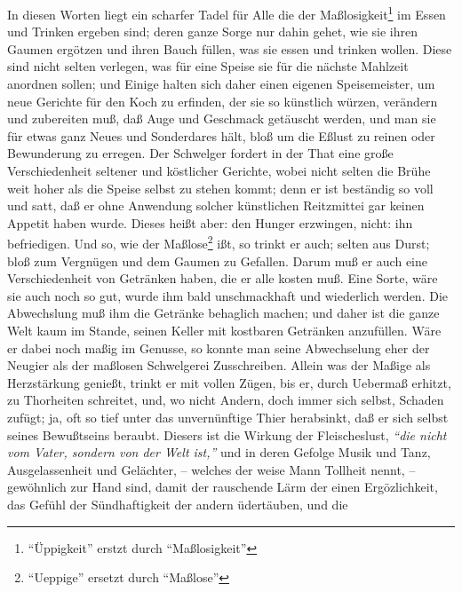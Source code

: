 \medskip

In diesen Worten liegt ein scharfer Tadel für Alle die der Maßlosigkeit\footnote{"`Üppigkeit"' erstzt durch "`Maßlosigkeit"'} im Essen
und Trinken ergeben sind; deren ganze Sorge nur dahin gehet, wie sie ihren
Gaumen ergötzen und ihren Bauch füllen, was sie essen und trinken wollen. Diese
sind nicht selten verlegen, was für eine Speise sie für die nächste Mahlzeit
anordnen sollen; und Einige halten sich daher einen eigenen Speisemeister, um
neue Gerichte für den Koch zu erfinden, der sie so künstlich würzen, verändern
und zubereiten muß, daß Auge und Geschmack getäuscht werden, und man sie für
etwas ganz Neues und Sonderdares hält, bloß um die Eßlust zu reinen oder
Bewunderung zu erregen. Der Schwelger fordert in der That eine große
Verschiedenheit seltener und köstlicher Gerichte, wobei nicht selten die Brühe
weit hoher als die Speise selbst zu stehen kommt; denn er ist beständig so voll
und satt, daß er ohne Anwendung solcher künstlichen Reitzmittei gar keinen
Appetit haben wurde. Dieses heißt aber: den Hunger erzwingen, nicht: ihn
befriedigen. Und so, wie der Maßlose\footnote{"`Ueppige"' ersetzt durch "`Maßlose"'} ißt, so trinkt er auch; selten aus Durst;
bloß zum Vergnügen und dem Gaumen zu Gefallen. Darum muß er auch eine
Verschiedenheit von Getränken haben, die er alle kosten muß. Eine Sorte, wäre
sie auch noch so gut, wurde ihm bald unschmackhaft und wiederlich werden. Die
Abwechslung muß ihm die Getränke behaglich machen; und daher ist die ganze Welt
kaum im Stande, seinen Keller mit kostbaren Getränken anzufüllen. Wäre er dabei
noch maßig im Genusse, so konnte man seine Abwechselung eher der Neugier als der
maßlosen Schwelgerei Zusschreiben. Allein was der Maßige als Herzstärkung
genießt, trinkt er mit vollen Zügen, bis er, durch Uebermaß erhitzt, zu
Thorheiten schreitet, und, wo nicht Andern, doch immer sich selbst, Schaden
zufügt; ja, oft so tief unter das unvernünftige Thier herabsinkt, daß er sich
selbst seines Bewußtseins beraubt. Diesers ist die Wirkung der Fleischeslust,
\textit{"`die nicht vom Vater, sondern von der Welt ist,"'} und in deren Gefolge Musik und Tanz, Ausgelassenheit und Gelächter, -- welches der weise Mann Tollheit
nennt, -- gewöhnlich zur Hand sind, damit der rauschende Lärm der einen
Ergözlichkeit, das Gefühl der Sündhaftigkeit der andern üdertäuben, und die
